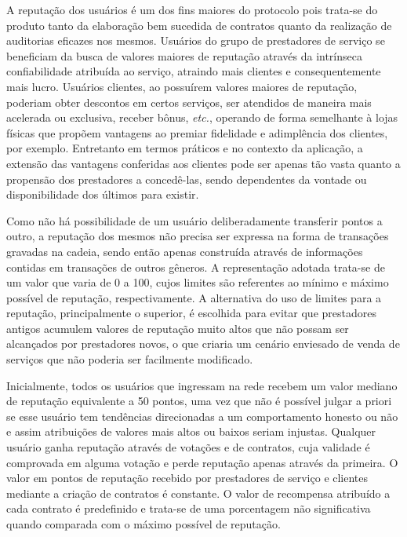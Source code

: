 A reputação dos usuários é um dos fins maiores do protocolo pois trata-se do produto tanto da elaboração bem sucedida de contratos quanto da realização de auditorias eficazes nos mesmos. Usuários do grupo de prestadores de serviço se beneficiam da busca de valores maiores de reputação através da intrínseca confiabilidade atribuída ao serviço, atraindo mais clientes e consequentemente mais lucro. Usuários clientes, ao possuírem valores maiores de reputação, poderiam obter descontos em certos serviços, ser atendidos de maneira mais acelerada ou exclusiva, receber bônus, \textit{etc.}, operando de forma semelhante à lojas físicas que propõem vantagens ao premiar fidelidade e adimplência dos clientes, por exemplo. Entretanto em termos práticos e no contexto da aplicação, a extensão das vantagens conferidas aos clientes pode ser apenas tão vasta quanto a propensão dos prestadores a concedê-las, sendo dependentes da vontade ou disponibilidade dos últimos para existir.

%
Como não há possibilidade de um usuário deliberadamente transferir pontos a outro, a reputação dos mesmos não precisa ser expressa na forma de transações gravadas na cadeia, sendo então apenas construída através de informações contidas em transações de outros gêneros. 
%
A representação adotada trata-se de um valor que varia de 0 a 100, cujos limites são referentes ao mínimo e máximo possível de reputação, respectivamente. A alternativa do uso de limites para a reputação, principalmente o superior, é escolhida para evitar que prestadores antigos acumulem valores de reputação muito altos que não possam ser alcançados por prestadores novos, o que criaria um cenário enviesado de venda de serviços que não poderia ser facilmente modificado.
%

Inicialmente, todos os usuários que ingressam na rede recebem um valor mediano de reputação equivalente a 50 pontos, uma vez que não é possível julgar a priori se esse usuário tem tendências direcionadas a um comportamento honesto ou não e assim atribuições de valores mais altos ou baixos seriam injustas. Qualquer usuário ganha reputação através de votações e de contratos, cuja validade é comprovada em alguma votação e perde reputação apenas através da primeira. O valor em pontos de reputação recebido por prestadores de serviço e clientes mediante a criação de contratos é constante. O valor de recompensa atribuído a cada contrato é predefinido e trata-se de uma porcentagem não significativa quando comparada com o máximo possível de reputação. 

